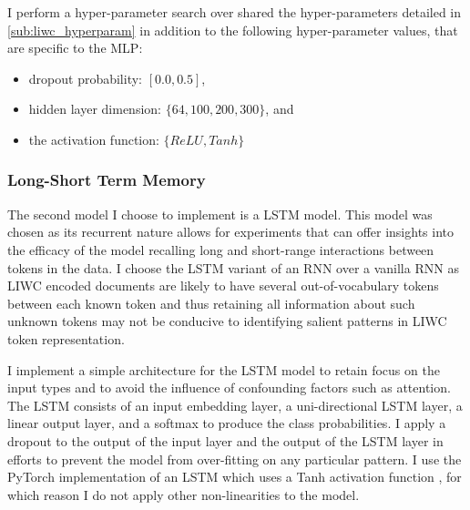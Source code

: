 I perform a hyper-parameter search over shared the hyper-parameters detailed in \cref{sub:liwc_hyperparam} in addition to the following hyper-parameter values, that are specific to the MLP:

\begin{itemize}
  \item dropout probability: $[0.0, 0.5]$,
  \item hidden layer dimension: $\{64, 100, 200, 300\}$, and
  \item the activation function: $\{ReLU, Tanh\}$
\end{itemize}

\subsubsection{Long-Short Term Memory}

The second model I choose to implement is a LSTM model. This model was chosen as its recurrent nature allows for experiments that can offer insights into the efficacy of the model recalling long and short-range interactions between tokens in the data. I choose the LSTM variant of an RNN over a vanilla RNN as LIWC encoded documents are likely to have several out-of-vocabulary tokens between each known token and thus retaining all information about such unknown tokens may not be conducive to identifying salient patterns in LIWC token representation.


I implement a simple architecture for the LSTM model to retain focus on the input types and to avoid the influence of confounding factors such as attention. The LSTM consists of an input embedding layer, a uni-directional LSTM layer, a linear output layer, and a softmax to produce the class probabilities.
I apply a dropout to the output of the input layer and the output of the LSTM layer in efforts to prevent the model from over-fitting on any particular pattern. I use the PyTorch implementation of an LSTM which uses a Tanh activation function \citep{Paszke:2019}, for which reason I do not apply other non-linearities to the model.

